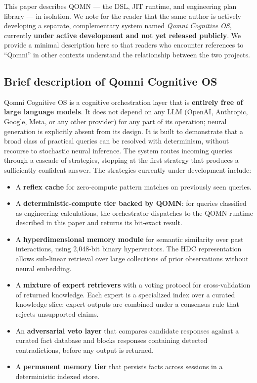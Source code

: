 \documentclass[11pt,a4paper]{article}
\begin{document}
This paper describes QOMN --- the DSL, JIT runtime, and engineering plan library --- in isolation. We note for the reader that the same author is actively developing a separate, complementary system named \emph{Qomni Cognitive OS}, currently \textbf{under active development and not yet released publicly}. We provide a minimal description here so that readers who encounter references to ``Qomni'' in other contexts understand the relationship between the two projects.

\subsection{Brief description of Qomni Cognitive OS}

Qomni Cognitive OS is a cognitive orchestration layer that is \textbf{entirely free of large language models}. It does not depend on any LLM (OpenAI, Anthropic, Google, Meta, or any other provider) for any part of its operation; neural generation is explicitly absent from its design. It is built to demonstrate that a broad class of practical queries can be resolved with determinism, without recourse to stochastic neural inference. The system routes incoming queries through a cascade of strategies, stopping at the first strategy that produces a sufficiently confident answer. The strategies currently under development include:

\begin{itemize}[leftmargin=*]
\item A \textbf{reflex cache} for zero-compute pattern matches on previously seen queries.
\item A \textbf{deterministic-compute tier backed by QOMN}: for queries classified as engineering calculations, the orchestrator dispatches to the QOMN runtime described in this paper and returns its bit-exact result.
\item A \textbf{hyperdimensional memory module} for semantic similarity over past interactions, using 2{,}048-bit binary hypervectors. The HDC representation allows sub-linear retrieval over large collections of prior observations without neural embedding.
\item A \textbf{mixture of expert retrievers} with a voting protocol for cross-validation of returned knowledge. Each expert is a specialized index over a curated knowledge slice; expert outputs are combined under a consensus rule that rejects unsupported claims.
\item An \textbf{adversarial veto layer} that compares candidate responses against a curated fact database and blocks responses containing detected contradictions, before any output is returned.
\item A \textbf{permanent memory tier} that persists facts across sessions in a deterministic indexed store.
\end{itemize}
\end{document}
